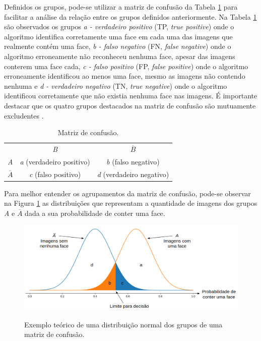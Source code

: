 Definidos os grupos, pode-se utilizar a matriz de confusão da Tabela \ref{tab:matriz_de_confusao} para facilitar a análise da relação entre os grupos definidos anteriormente. Na Tabela \ref{tab:matriz_de_confusao} são observados os grupos \textit{a - verdadeiro positivo} (TP, \textit{true positive}) onde o algoritmo identifica corretamente uma face em cada uma das imagens que realmente contém uma face, \textit{b - falso negativo} (FN, \textit{false negative}) onde o algoritmo erroneamente não reconheceu nenhuma face, apesar das imagens conterem uma face cada, \textit{c - falso positivo} (FP, \textit{false positive}) onde o algoritmo erroneamente identificou ao menos uma face, mesmo as imagens não contendo nenhuma e \textit{d - verdadeiro negativo} (TN, \textit{true negative}) onde o algoritmo identificou corretamente que não existia nenhuma face nas imagens. É importante destacar que os quatro grupos destacados na matriz de confusão são mutuamente excludentes \cite{Dougherty:2012:PRC:2553126}.

\begin{table}[htbp]
    \caption{Matriz de confusão.}
    \label{tab:matriz_de_confusao}
    \centering
    \begin{tabular}{ccc}\hline\hline
                       & \textit{B}                       & $\overline{B}$                   \\
        \textit{A}     & \textit{a} (verdadeiro positivo) & \textit{b} (falso negativo)      \\
        $\overline{A}$ & \textit{c} (falso positivo)      & \textit{d} (verdadeiro negativo) \\
        \hline\hline
    \end{tabular}
\end{table}

Para melhor entender os agrupamentos da matriz de confusão, pode-se observar na Figura \ref{fig:norm_dist} as distribuições que representam a quantidade de imagens dos grupos \textit{A} e $\overline{A}$ dada a sua probabilidade de conter uma face.

\begin{figure}[htbp]
    \centering
    \caption{Exemplo teórico de uma distribuição normal dos grupos de uma matriz de confusão.}
    \includegraphics[scale=.4]{figs/norm_dist.png}
    \label{fig:norm_dist}
\end{figure}

